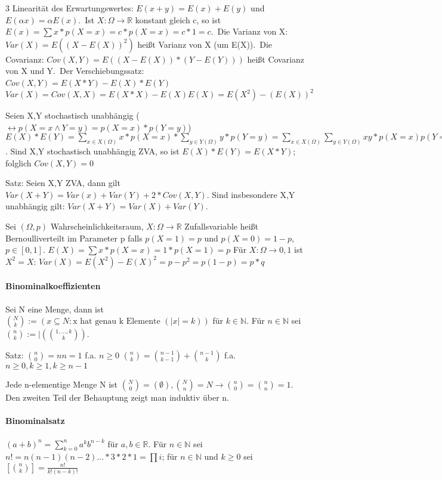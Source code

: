 \documentclass[a4paper]{article}
\begin{document}
\begin{multicols}{3}
    Linearität des Erwartungswertes: $E(x+y)=E(x)+E(y)$ und $E(\alpha x)=\alpha E(x)$.\
    Ist $X:\Omega\rightarrow \mathbb{R}$ konstant gleich c, so ist $E(x)=\sum x*p(X=x)=c*p(X=x)=c*1=c$.\
    Die Varianz von X: $Var(X)=E((X-E(X))^2)$ heißt Varianz von X (um E(X)).\
    Die Covarianz: $Cov(X,Y)=E((X-E(X))*(Y-E(Y)))$ heißt Covarianz von X und Y.\
    Der Verschiebungssatz: $Cov(X,Y)=E(X*Y)-E(X)*E(Y)$\
    $Var(X)=Cov(X,X)=E(X*X)-E(X)E(X)=E(X^2)-(E(X))^2$
    
    Seien X,Y stochastisch unabhängig ($\leftrightarrow p(X=x \wedge Y=y)=p(X=x)*p(Y=y)$)
    $E(X)*E(Y)=\sum_{x\in X(\Omega)} x*p(X=x)* \sum_{y\in Y(\Omega)} y*p(Y=y)=\sum_{x\in X(\Omega)} \sum_{y\in Y(\Omega)} xy*p(X=x)p(Y=y)=\sum_{Z\in\mathbb{R}} z*p(X*Y=Z) = E(X*Y)$. 
    Sind X,Y stochastisch unabhängig ZVA, so ist $E(X)*E(Y)=E(X*Y)$; folglich $Cov(X,Y)=0$
    
    Satz: Seien X,Y ZVA, dann gilt $Var(X+Y)=Var(x)+Var(Y)+2*Cov(X,Y)$. Sind insbesondere X,Y unabhängig gilt: $Var(X+Y)=Var(X)+Var(Y)$.
    
    Sei $(\Omega, p)$ Wahrscheinlichkeitsraum, $X:\Omega\rightarrow \mathbb{R}$ Zufallsvariable heißt Bernoulliverteilt im Parameter p falls $p(X=1)=p$ und $p(X=0)=1-p$, $p\in [0,1]$. $E(X)=\sum x*p(X=x)= 1*p(X=1)=p$
    Für $X:\Omega\rightarrow {0,1}$ ist $X^2=X$: $Var(X)=E(X^2)-E(X)^2 = p-p^2 = p(1-p)=p*q$
    
    \paragraph{Binominalkoeffizienten}
    Sei N eine Menge, dann ist $\binom{N}{k} := (x \subseteq N: \text{x hat genau k Elemente } (|x|=k) )$ für $k\in \mathbb{N}$. Für $n\in \mathbb{N}$ sei $\binom{n}{k}:=|(\binom{1,...,k}{k})$.
    
    Satz: $\binom{n}{0}={n}{n}=1$ f.a. $n\geq 0$ $\binom{n}{k}=\binom{n-1}{k-1}+\binom{n-1}{k}$ f.a. $n\geq 0,k\geq 1, k\geq n-1$
    
    Jede n-elementige Menge N ist $\binom{N}{0}=(\emptyset), \binom{N}{n}={N}\rightarrow \binom{n}{0}=\binom{n}{n}=1$. Den zweiten Teil der Behauptung zeigt man induktiv über n.
    
    \paragraph{Binominalsatz}
    $(a+b)^n = \sum_{k=0}^n a^k b^{n-k}$ für $a,b\in \mathbb{R}$. 
    Für $n\in \mathbb{N}$ sei $n!=n(n-1)(n-2)...*3*2*1=\prod i$; für $n\in\mathbb{N}$ und $k\geq 0$ sei $[\binom{n}{k}]=\frac{n!}{k!(n-k)!}$
    

\end{multicols}
\end{document}
